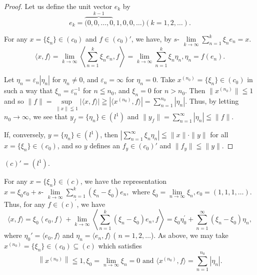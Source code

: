 \begin{proof}
 Let us define the unit vector $e_k$ by 
\[
e _{k} = \overbrace {(0 , 0 , \dots , 0} ^{k-1}, 1, 0, 0, \dots) (k = 1, 2, \dots). \]

For any $x = \{\xi_n\} \in (c_0)$ and $f \in (c_0)'$, we have, by $s\text{- }\lim\limits_{k \to \infty} \sum\limits_{n=1}^{k} \xi_n e_n = x$. 
\[
\langle x, f \rangle = \lim\limits _{k \rightarrow \infty} \left\langle \sum\limits_{n=1} ^{k} \xi_{n} e _{n}, f \right\rangle = \lim\limits _{k \rightarrow \infty} \sum\limits_{n=1} ^{k} \xi_{n} \eta_{n}, \eta_{n} = f (e _{n}).
\]

Let $\eta_n = \varepsilon_n |\eta_n|$ for $\eta_n \neq 0$, and $\varepsilon_n = \infty$ for $\eta_n = 0$. Take $x^{(n_0)} = \{\xi_n\} \in (c_0)$ in such a way that $\xi_n = \varepsilon_n^{-1}$ for $n \leqq n_0$, and $\xi_n = 0$ for $n > n_0$. Then $\|x^{(n_0)}\| \leqq 1$ and so $\|f\| = \sup\limits_{\|x\| \leqq 1} |\langle x, f \rangle| \geqq |\langle x^{(n_0)}, f \rangle| = \sum\limits_{n=1}^{n_0} |\eta_n|$. Thus, by letting $n_0 \to \infty$, we see that $y_f = \{\eta_n\} \in (l^1)$ and $\|y_f\| = \sum\limits_{n=1}^{\infty} |\eta_n| \leqq \|f\|$. 

If, conversely, $y = \{\eta_n\} \in (l^1)$, then $\left|\sum\limits_{n=1}^{\infty} \xi_n \eta_n\right| \leqq \|x\| \cdot \|y\|$ for all $x = \{\xi_n\} \in (c_0)$, and so $y$ defines an $f_y \in (c_0)'$ and $\|f_y\| \leqq \|y\|$. 
\end{proof}

\begin{example}\label{ex:IV.9.Example.2} $(c)' = (l^1)$. 
\end{example}

For any $x = \{\xi_n\} \in (c)$, we have the representation 
$x = \xi_0e_0 + s\text{- }\lim\limits_{k\to \infty}\sum\limits_{n=1}^{k}(\xi_n - \xi_0)e_n,$ where $\xi_0 = \lim\limits_{n\to \infty}\xi_n,e_0 = (1,1,1,\ldots)$. Thus, for any $f\in (c)^{\prime}$, we have 
\begin{equation}\label{eq:IV.9.2}
\langle x, f \rangle = \xi_{0} \left\langle e _{0}, f \right\rangle + \lim\limits _{k \rightarrow \infty} \left\langle \sum\limits_{n=1} ^{k} \left(\xi_{n} - \xi_{0}\right) e _{n}, f \right\rangle = \xi_{0} \eta_{0} ^{\prime} + \sum\limits_{n=1} ^{\infty} \left(\xi_{n} - \xi_{0}\right) \eta_{n},
\end{equation}
where $\eta_0' = \langle e_0, f \rangle$ and $\eta_n = \langle e_n, f \rangle$ ( $n = 1, 2, \ldots$). As above, we may take $x^{(n_0)} = \{\xi_n\} \in (c_0) \subseteq (c)$ which satisfies 
\[
\left\| x ^ {\left(n _{0}\right)} \right\| \leqq 1, \xi_{0} = \lim\limits _{n \rightarrow \infty} \xi_{n} = 0 \text{ and } \langle x ^ {\left(n _{0}\right)}, f \rangle = \sum\limits_{n=1} ^ {n _{0}} | \eta_{n} |.
\]

